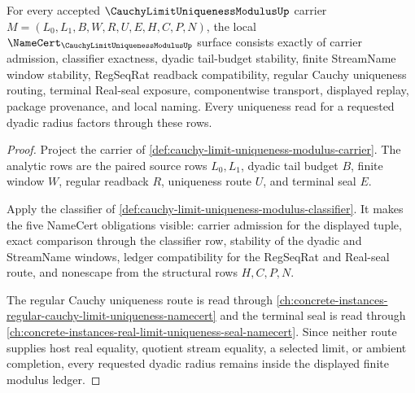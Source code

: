 \begin{theorem}
\label{thm:cauchy-limit-uniqueness-modulus-namecert}
For every accepted $\CauchyLimitUniquenessModulusUp$ carrier $M=(L_0,L_1,B,W,R,U,E,H,C,P,N)$, the local $\NameCert_{\CauchyLimitUniquenessModulusUp}$ surface consists exactly of carrier admission, classifier exactness, dyadic tail-budget stability, finite StreamName window stability, RegSeqRat readback compatibility, regular Cauchy uniqueness routing, terminal Real-seal exposure, componentwise transport, displayed replay, package provenance, and local naming. Every uniqueness read for a requested dyadic radius factors through these rows.
\end{theorem}
\begin{proof}
Project the carrier of \autoref{def:cauchy-limit-uniqueness-modulus-carrier}. The analytic rows are the paired source rows $L_0,L_1$, dyadic tail budget $B$, finite window $W$, regular readback $R$, uniqueness route $U$, and terminal seal $E$.

Apply the classifier of \autoref{def:cauchy-limit-uniqueness-modulus-classifier}. It makes the five NameCert obligations visible: carrier admission for the displayed tuple, exact comparison through the classifier row, stability of the dyadic and StreamName windows, ledger compatibility for the RegSeqRat and Real-seal route, and nonescape from the structural rows $H,C,P,N$.

The regular Cauchy uniqueness route is read through \autoref{ch:concrete-instances-regular-cauchy-limit-uniqueness-namecert} and the terminal seal is read through \autoref{ch:concrete-instances-real-limit-uniqueness-seal-namecert}. Since neither route supplies host real equality, quotient stream equality, a selected limit, or ambient completion, every requested dyadic radius remains inside the displayed finite modulus ledger.
\end{proof}



